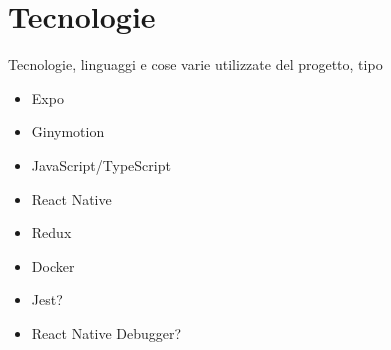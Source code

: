 
\chapter{Tecnologie}
Tecnologie, linguaggi e cose varie utilizzate del progetto, tipo 
\begin{itemize}
	\item Expo
	\item Ginymotion
	\item JavaScript/TypeScript
	\item React Native
	\item Redux
	\item Docker
	\item Jest?
	\item React Native Debugger?
\end{itemize}